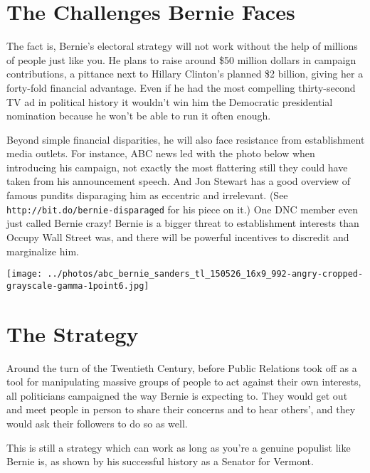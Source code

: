 \documentclass[notumble]{leaflet}
\begin{document}
\pagebreak

\section*{The Challenges Bernie Faces}

The fact is, Bernie's electoral strategy will not work without the
help of millions of people just like you.  He plans to raise around
\$50 million dollars in campaign contributions, a pittance next to
Hillary Clinton's planned \$2 billion, giving her a forty-fold
financial advantage.  Even if he had the most compelling thirty-second
TV ad in political history it wouldn't win him the Democratic
presidential nomination because he won't be able to run it often
enough.

Beyond simple financial disparities, he will also face resistance from
establishment media outlets.  For instance, ABC news led with the
photo below when introducing his campaign, not exactly the most
flattering still they could have taken from his announcement speech.
And Jon Stewart has a good overview of famous pundits disparaging him
as eccentric and irrelevant. (See {\tt
  http://bit.do/bernie-disparaged} for his piece on it.)  One DNC
member even just called Bernie crazy!  Bernie is a bigger threat to
establishment interests than Occupy Wall Street was, and there will be
powerful incentives to discredit and marginalize him.

\begin{center}
\texttt{[image: ../photos/abc\_bernie\_sanders\_tl\_150526\_16x9\_992-angry-cropped-grayscale-gamma-1point6.jpg]}
\end{center}

\pagebreak

\section*{The Strategy}

Around the turn of the Twentieth Century, before Public Relations took
off as a tool for manipulating massive groups of people to act against
their own interests, all politicians campaigned the way Bernie is
expecting to.  They would get out and meet people in person to share
their concerns and to hear others', and they would ask their followers
to do so as well.

This is still a strategy which can work as long as you're a genuine
populist like Bernie is, as shown by his successful history as a
Senator for Vermont.
\end{document}
